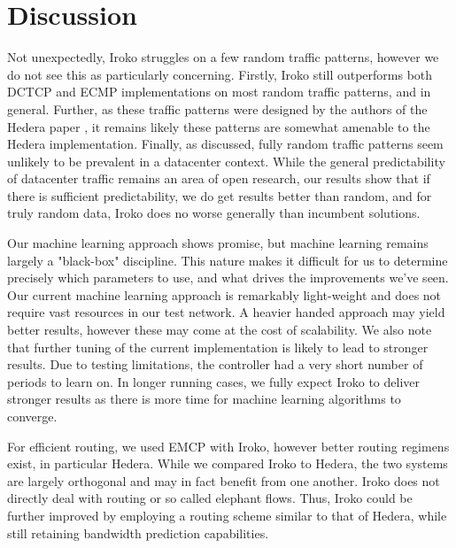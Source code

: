 \section{Discussion}
\label{sec:discussion}

Not unexpectedly, Iroko struggles on a few random traffic patterns, however we
do not see this as particularly concerning. Firstly, Iroko still outperforms
both DCTCP and ECMP implementations on most random traffic patterns, and in general.
Further, as these traffic patterns
were designed by the authors of the Hedera paper \cite{hedera}, it remains
likely these patterns are somewhat amenable to the Hedera implementation.
Finally, as discussed, fully random traffic patterns seem unlikely to be prevalent in a
datacenter context. While the general predictability of datacenter
traffic remains an area of open research, our results show that
if there is sufficient predictability, we do get results better than
random, and for truly random data, Iroko does no worse generally than
incumbent solutions. 

Our machine learning approach shows promise, but machine learning remains
largely a "black-box" discipline. This nature makes it difficult for us
to determine precisely which parameters to use, and what drives
the improvements we've seen. Our current machine learning approach
is remarkably light-weight and does not require vast resources
in our test network. A heavier handed approach may yield better
results, however these may come at the cost of scalability. We
also note that further tuning of the current implementation is
likely to lead to stronger results. Due to testing limitations, 
the controller had a very short number of periods to learn 
on. In longer running cases, we fully expect Iroko to 
deliver stronger results as there is more time for machine learning 
algorithms to converge. 

For efficient routing, we used EMCP with Iroko, however better
routing regimens exist, in particular Hedera. While we compared
Iroko to Hedera, the two systems are largely orthogonal
and may in fact benefit from one another. Iroko does not directly deal
with routing or so called elephant flows. Thus, Iroko could be
further improved by employing a routing scheme similar to that of
Hedera, while still retaining bandwidth prediction capabilities.


